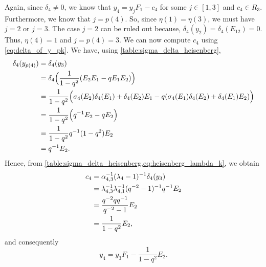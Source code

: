 \begin{example}
	Again, since $\delta_4 \neq 0$, we know that $y_4 = y_j F_1 -c_4$ for some $j \in [1,
			3]$ and $c_4 \in R_3$. Furthermore, we know that $j = p(4)$. So, since $\eta(1) =
		\eta(3)$, we must have $j = 2$ or $j = 3$. The case $j = 2$ can be ruled out because,
	$\delta_4(y_2) = \delta_4(E_{12}) = 0$. Thus, $\eta(4) = 1$ and $j = p(4) = 3$. We can
	now compute $c_4$ using \cref{eq:delta_of_y_pk}. We have, using
	\cref{table:sigma_delta_heisenberg},
	\begin{align*}
		\delta_4(y_{p(4)})
		 & = \delta_4(y_3)                                                                                                                \\
		 & = \delta_4\Bigl(\frac{1}{1-q^2}(E_2 E_1 - q E_1 E_2)\Bigr)                                                                     \\
		 & = \frac{1}{1-q^2}\Bigl(\sigma_4 (E_2)\delta_4(E_1) + \delta_4(E_2)E_1 - q(\sigma_4(E_1)\delta_4(E_2) + \delta_4(E_1)E_2)\Bigr) \\
		 & = \frac{1}{1-q^2}\Bigl(q^{-1} E_2  - qE_2\Bigr)                                                                                 \\
		 & = \frac{1}{1-q^2} q^{-1} (1- q^2) E_2                                                                                           \\
		 & = q^{-1} E_2.
	\end{align*}
	Hence, from \cref{table:sigma_delta_heisenberg,eq:heisenberg_lambda_k}, we obtain
	\begin{align*}
		c_4 & = \alpha_{4,3}^{-1} (\lambda_4 - 1)^{-1} \delta_4(y_3)           \\
		    & = \lambda_{4,3}^{-1}\lambda_{4,1}^{-1} (q^{-2} -1)^{-1} q^{-1} E_2 \\
		    & = \frac{q^{-2}qq^{-1}}{q^{-2} - 1} E_2                          \\
		    & = \frac{1}{1 - q^2} E_2,
	\end{align*}
	and consequently
	\begin{equation*}
		y_4 = y_3 F_1 - \frac{1}{1-q^2}E_2.
	\end{equation*}


\end{example}
